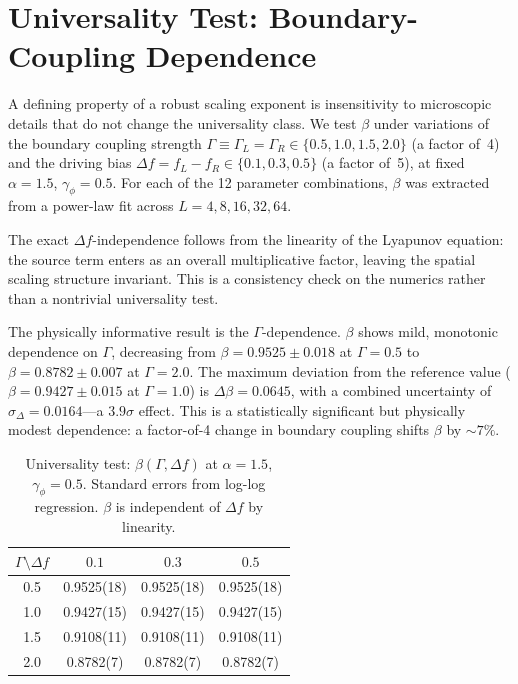 \documentclass[aps,prb,twocolumn,superscriptaddress,floatfix]{revtex4-2}
\begin{document}
\section{Universality Test: Boundary-Coupling Dependence}
\label{sec:universality}

A defining property of a robust scaling exponent is insensitivity to microscopic details that do not change the universality class. We test $\beta$ under variations of the boundary coupling strength $\Gamma \equiv \Gamma_L = \Gamma_R \in \{0.5, 1.0, 1.5, 2.0\}$ (a factor of~4) and the driving bias $\Delta f = f_L - f_R \in \{0.1, 0.3, 0.5\}$ (a factor of~5), at fixed $\alpha = 1.5$, $\gamma_\phi = 0.5$. For each of the 12 parameter combinations, $\beta$ was extracted from a power-law fit across $L = 4, 8, 16, 32, 64$.

The exact $\Delta f$-independence follows from the linearity of the Lyapunov equation: the source term enters as an overall multiplicative factor, leaving the spatial scaling structure invariant. This is a consistency check on the numerics rather than a nontrivial universality test.

The physically informative result is the $\Gamma$-dependence. $\beta$ shows mild, monotonic dependence on $\Gamma$, decreasing from $\beta = 0.9525 \pm 0.018$ at $\Gamma = 0.5$ to $\beta = 0.8782 \pm 0.007$ at $\Gamma = 2.0$. The maximum deviation from the reference value ($\beta = 0.9427 \pm 0.015$ at $\Gamma = 1.0$) is $\Delta\beta = 0.0645$, with a combined uncertainty of $\sigma_\Delta = 0.0164$---a $3.9\sigma$ effect. This is a statistically significant but physically modest dependence: a factor-of-4 change in boundary coupling shifts $\beta$ by $\sim 7\%$.

\begin{table}[tbp]
\caption{Universality test: $\beta(\Gamma, \Delta f)$ at $\alpha = 1.5$, $\gamma_\phi = 0.5$. Standard errors from log-log regression. $\beta$ is independent of $\Delta f$ by linearity.}
\label{tab:universality}
\begin{ruledtabular}
\begin{tabular}{cccc}
$\Gamma \setminus \Delta f$ & $0.1$ & $0.3$ & $0.5$ \\
\hline
0.5 & 0.9525(18) & 0.9525(18) & 0.9525(18) \\
1.0 & 0.9427(15) & 0.9427(15) & 0.9427(15) \\
1.5 & 0.9108(11) & 0.9108(11) & 0.9108(11) \\
2.0 & 0.8782(7)  & 0.8782(7)  & 0.8782(7)
\end{tabular}
\end{ruledtabular}
\end{table}
\end{document}
